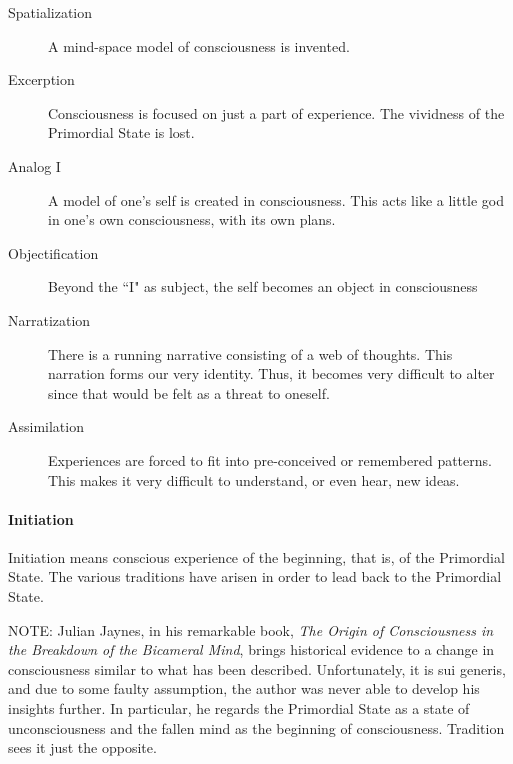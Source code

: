 \begin{description}
\item[Spatialization ]

A mind-space model of consciousness is invented. 

\item[Excerption ]

Consciousness is focused on just a part of experience. The vividness of the Primordial State is lost. 

\item[Analog I ]

A model of one's self is created in consciousness. This acts like a little god in one's own consciousness, with its own plans. 

\item[Objectification ]

Beyond the ``I" as subject, the self becomes an object in consciousness 

\item[Narratization ]

There is a running narrative consisting of a web of thoughts. This narration forms our very identity. Thus, it becomes very difficult to alter since that would be felt as a threat to oneself. 

\item[Assimilation ]

Experiences are forced to fit into pre-conceived or remembered patterns. This makes it very difficult to understand, or even hear, new ideas. 

\end{description}
\paragraph{Initiation}
Initiation means conscious experience of the beginning, that is, of the Primordial State. The various traditions have arisen in order to lead back to the Primordial State.


\hfill

NOTE: Julian Jaynes, in his remarkable book, \emph{The Origin of Consciousness in the Breakdown of the Bicameral Mind}, brings historical evidence to a change in consciousness similar to what has been described. Unfortunately, it is sui generis, and due to some faulty assumption, the author was never able to develop his insights further. In particular, he regards the Primordial State as a state of unconsciousness and the fallen mind as the beginning of consciousness. Tradition sees it just the opposite.



